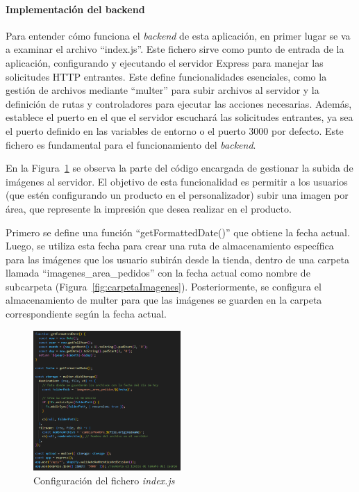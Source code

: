 \documentclass[12pt]{article}
\newcommand{\subsubsubsection}[1]{\paragraph{#1}}
\begin{document}
\clearpage
\subsubsubsection{Implementación del backend}

Para entender cómo funciona el \textit{backend} de esta aplicación, en primer lugar se va a examinar el archivo ``index.js''. Este fichero sirve como 
punto de entrada de la aplicación, configurando y ejecutando el servidor Express para manejar las solicitudes HTTP entrantes. Este define funcionalidades
esenciales, como la gestión de archivos mediante ``multer'' para subir archivos al servidor y la definición de rutas y controladores para ejecutar
las acciones necesarias. Además, establece el puerto en el que el servidor escuchará las solicitudes entrantes, ya sea el puerto definido en las 
variables de entorno o el puerto 3000 por defecto. Este fichero es fundamental para el funcionamiento del \textit{backend}.

En la Figura~\ref{fig:configIndex} se observa la parte del código encargada de gestionar la subida de imágenes al servidor. El objetivo de esta 
funcionalidad es permitir a los usuarios (que estén configurando un producto en el personalizador) subir una imagen por área, que represente la impresión que desea
realizar en el producto. 

Primero se define una función ``getFormattedDate()'' que obtiene la fecha actual. Luego, se utiliza esta fecha para crear una ruta de almacenamiento específica para 
las imágenes que los usuario subirán desde la tienda, dentro de una carpeta llamada ``imagenes\_area\_pedidos'' con la fecha actual como nombre de subcarpeta (Figura~\ref{fig:carpetaImagenes}).
Posteriormente, se configura el almacenamiento de multer para que las imágenes se guarden en la carpeta correspondiente según la fecha actual.

\begin{figure}[ht]
    \centering
    \includegraphics[width=0.5\textwidth]{imagenes-back/configuracionIndexjs.png}
    \caption{\label{fig:configIndex} Configuración del fichero \textit{index.js} }
    \vspace{\fill}
\end{figure}
\end{document}
